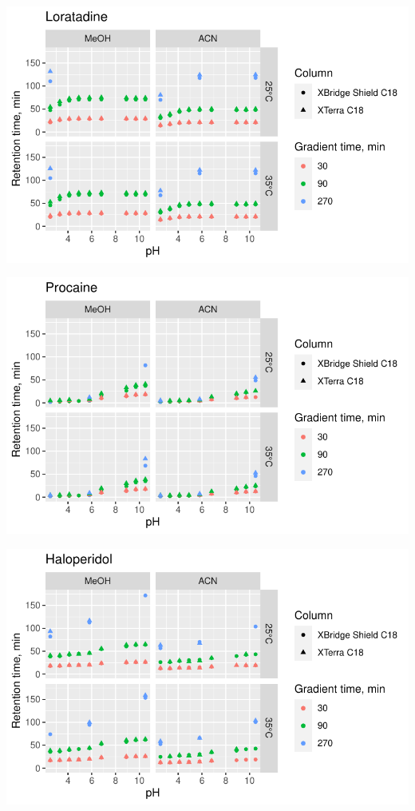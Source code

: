 \documentclass[
  letterpaper,
  DIV=11,
  numbers=noendperiod]{scrreprt}
\begin{document}
\includegraphics{index_files/figure-pdf/unnamed-chunk-4-78.pdf}

\includegraphics{index_files/figure-pdf/unnamed-chunk-4-79.pdf}

\includegraphics{index_files/figure-pdf/unnamed-chunk-4-80.pdf}
\end{document}
